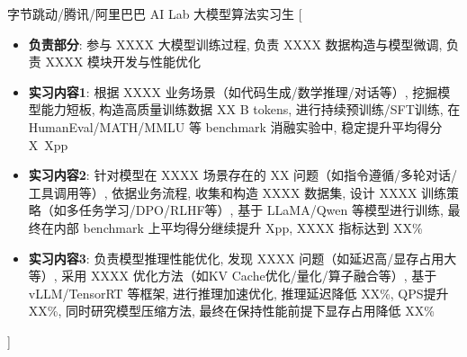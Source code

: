 \documentclass[zh]{resume}
\begin{document}
\begin{experiences}
    {字节跳动/腾讯/阿里巴巴 \quad AI Lab \quad 大模型算法实习生}%
    [\begin{itemize}
      \item \textbf{负责部分}: 参与 XXXX 大模型训练过程, 负责 XXXX 数据构造与模型微调, 负责 XXXX 模块开发与性能优化
      \item \textbf{实习内容1}: 根据 XXXX 业务场景（如代码生成/数学推理/对话等）, 挖掘模型能力短板, 构造高质量训练数据 XX B tokens, 进行持续预训练/SFT训练, 在 HumanEval/MATH/MMLU 等 benchmark 消融实验中, 稳定提升平均得分 X~Xpp
      \item \textbf{实习内容2}: 针对模型在 XXXX 场景存在的 XX 问题（如指令遵循/多轮对话/工具调用等）, 依据业务流程, 收集和构造 XXXX 数据集, 设计 XXXX 训练策略（如多任务学习/DPO/RLHF等）, 基于 LLaMA/Qwen 等模型进行训练, 最终在内部 benchmark 上平均得分继续提升 Xpp, XXXX 指标达到 XX\%
      \item \textbf{实习内容3}: 负责模型推理性能优化, 发现 XXXX 问题（如延迟高/显存占用大等）, 采用 XXXX 优化方法（如KV Cache优化/量化/算子融合等）, 基于 vLLM/TensorRT 等框架, 进行推理加速优化, 推理延迟降低 XX\%, QPS提升 XX\%, 同时研究模型压缩方法, 最终在保持性能前提下显存占用降低 XX\%
    \end{itemize}]
\end{experiences}
\end{document}
